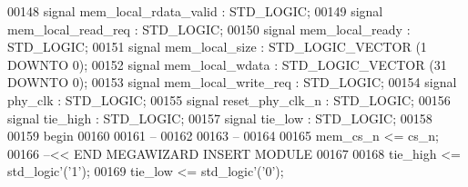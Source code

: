 \begin{DoxyCode}
{00148                 \textcolor{keywordflow}{signal} \textcolor{vhdlchar}{mem_local_rdata_valid} \textcolor{vhdlchar}{:}  \textcolor{comment}{STD\_LOGIC};
00149                 \textcolor{keywordflow}{signal} \textcolor{vhdlchar}{mem_local_read_req} \textcolor{vhdlchar}{:}  \textcolor{comment}{STD\_LOGIC};
00150                 \textcolor{keywordflow}{signal} \textcolor{vhdlchar}{mem_local_ready} \textcolor{vhdlchar}{:}  \textcolor{comment}{STD\_LOGIC};
00151                 \textcolor{keywordflow}{signal} \textcolor{vhdlchar}{mem_local_size} \textcolor{vhdlchar}{:}  \textcolor{comment}{STD\_LOGIC\_VECTOR} \textcolor{vhdlchar}{(}\textcolor{vhdllogic}{}\textcolor{vhdllogic}{1} \textcolor{keywordflow}{DOWNTO} \textcolor{vhdllogic}{}\textcolor{vhdllogic}{0}\textcolor{vhdlchar}{)};
00152                 \textcolor{keywordflow}{signal} \textcolor{vhdlchar}{mem_local_wdata} \textcolor{vhdlchar}{:}  \textcolor{comment}{STD\_LOGIC\_VECTOR} \textcolor{vhdlchar}{(}\textcolor{vhdllogic}{}\textcolor{vhdllogic}{31} \textcolor{keywordflow}{DOWNTO} \textcolor{vhdllogic}{}\textcolor{vhdllogic}{0}\textcolor{vhdlchar}{)};
00153                 \textcolor{keywordflow}{signal} \textcolor{vhdlchar}{mem_local_write_req} \textcolor{vhdlchar}{:}  \textcolor{comment}{STD\_LOGIC};
00154                 \textcolor{keywordflow}{signal} \textcolor{vhdlchar}{phy_clk} \textcolor{vhdlchar}{:}  \textcolor{comment}{STD\_LOGIC};
00155                 \textcolor{keywordflow}{signal} \textcolor{vhdlchar}{reset_phy_clk_n} \textcolor{vhdlchar}{:}  \textcolor{comment}{STD\_LOGIC};
00156                 \textcolor{keywordflow}{signal} \textcolor{vhdlchar}{tie_high} \textcolor{vhdlchar}{:}  \textcolor{comment}{STD\_LOGIC};
00157                 \textcolor{keywordflow}{signal} \textcolor{vhdlchar}{tie_low} \textcolor{vhdlchar}{:}  \textcolor{comment}{STD\_LOGIC};
00158 
00159 \textcolor{vhdlkeyword}{begin}
00160 
00161 \textcolor{keyword}{  --}
00162  
00163 \textcolor{keyword}{  --}
00164  
00165   \textcolor{vhdlchar}{mem_cs_n} \textcolor{vhdlchar}{<=} \textcolor{vhdlchar}{cs_n};
00166 \textcolor{keyword}{  --<< END MEGAWIZARD INSERT MODULE}
00167 
00168   \textcolor{vhdlchar}{tie_high} \textcolor{vhdlchar}{<=} \textcolor{comment}{std\_logic}\textcolor{vhdlchar}{'}\textcolor{vhdlchar}{(}\textcolor{vhdlchar}{'}\textcolor{vhdllogic}{}\textcolor{vhdllogic}{1}\textcolor{vhdlchar}{'}\textcolor{vhdlchar}{)};
00169   \textcolor{vhdlchar}{tie_low} \textcolor{vhdlchar}{<=} \textcolor{comment}{std\_logic}\textcolor{vhdlchar}{'}\textcolor{vhdlchar}{(}\textcolor{vhdlchar}{'}\textcolor{vhdllogic}{}\textcolor{vhdllogic}{0}\textcolor{vhdlchar}{'}\textcolor{vhdlchar}{)};
}
\end{DoxyCode}

